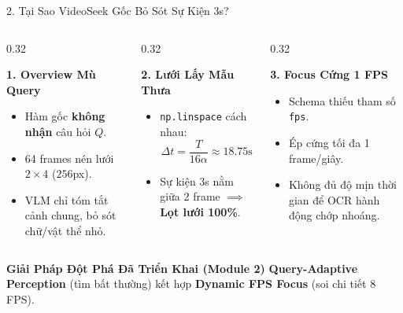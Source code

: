 \documentclass[aspectratio=169, 10pt]{beamer}
\begin{document}
\begin{frame}{2. Tại Sao VideoSeek Gốc Bỏ Sót Sự Kiện 3s?}
    \small
    \begin{columns}[T]
        \begin{column}{0.32\textwidth}
            \begin{alertblock}{\textbf{1. Overview Mù Query}}
                \begin{itemize}\footnotesize
                    \item Hàm gốc \textbf{không nhận} câu hỏi $Q$.
                    \item 64 frames nén lưới $2\times 4$ ($256$px).
                    \item VLM chỉ tóm tắt cảnh chung, bỏ sót chữ/vật thể nhỏ.
                \end{itemize}
            \end{alertblock}
        \end{column}

        \begin{column}{0.32\textwidth}
            \begin{alertblock}{\textbf{2. Lưới Lấy Mẫu Thưa}}
                \begin{itemize}\footnotesize
                    \item \texttt{np.linspace} cách nhau:
                    $$\Delta t = \frac{T}{16\alpha} \approx 18.75\text{s}$$
                    \item Sự kiện 3s nằm giữa 2 frame $\implies$ \textbf{Lọt lưới 100\%}.
                \end{itemize}
            \end{alertblock}
        \end{column}

        \begin{column}{0.32\textwidth}
            \begin{alertblock}{\textbf{3. Focus Cứng 1 FPS}}
                \begin{itemize}\footnotesize
                    \item Schema thiếu tham số \texttt{fps}.
                    \item Ép cứng tối đa 1 frame/giây.
                    \item Không đủ độ mịn thời gian để OCR hành động chớp nhoáng.
                \end{itemize}
            \end{alertblock}
        \end{column}
    \end{columns}

    \vspace{0.3cm}
    \begin{exampleblock}{\textbf{Giải Pháp Đột Phá Đã Triển Khai (Module 2)}}
        \centering
        \small \textbf{Query-Adaptive Perception} (tìm bất thường) kết hợp \textbf{Dynamic FPS Focus} (soi chi tiết 8 FPS).
    \end{exampleblock}
\end{frame}
\end{document}
